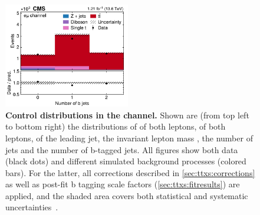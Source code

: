 \begin{figure}[!hp]
\hfill
\includegraphics[width=0.49\textwidth]{figures/ttxs/nbtag_em.pdf}
\caption{
    \textbf{Control distributions in the \emu channel.} Shown are (from top left to bottom right) the distributions of \pt of both leptons, \abseta of both leptons, \pt of the leading jet, the invariant lepton mass \mll, the number of jets and the number of b-tagged jets. All figures show both data (black dots) and different simulated background processes (colored bars). For the latter, all corrections described in \cref{sec:ttxs:corrections} as well as post-fit b tagging scale factors (\cref{sec:ttxs:fitresults}) are applied, and the shaded area covers both statistical and systematic uncertainties~\cite{CMS:TOP-22-012}.
}
\label{fig:ttxs:control_em}
\end{figure}

